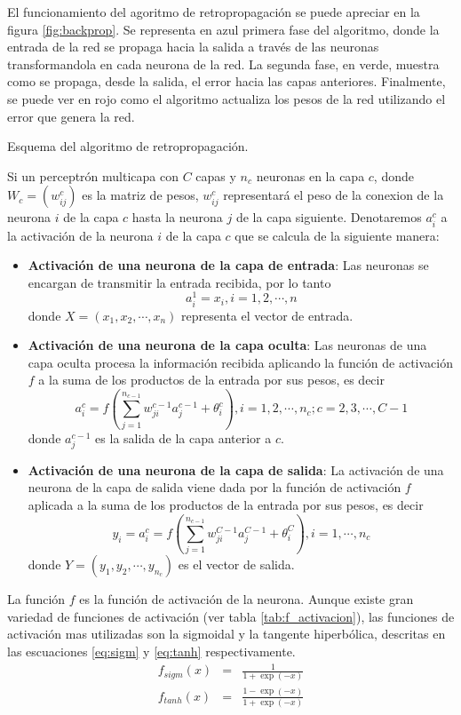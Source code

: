 El funcionamiento del agoritmo de retropropagación se puede apreciar en la figura \ref{fig:backprop}. Se representa en azul primera fase del algoritmo, donde la entrada de la red se propaga hacia la salida a través de las neuronas transformandola en cada neurona de la red. La segunda fase, en verde, muestra como se propaga, desde la salida, el error hacia las capas anteriores. Finalmente, se puede ver en rojo como el algoritmo actualiza los pesos de la red utilizando el error que genera la red.
\begin{imagen}
	\scalebox{1.0}{}
	\caption{Esquema del algoritmo de retropropagación.}
	\label{fig:backprop}
\end{imagen}

Si un perceptrón multicapa con $C$ capas y $n_c$ neuronas en la capa $c$, donde $W_c = (w^{c}_{ij})$ es la matriz de pesos, $w^{c}_{ij}$ representará el peso de la conexion de la neurona $i$ de la capa $c$ hasta la neurona $j$ de la capa siguiente. Denotaremos $a^{c}_{i}$ a la activación de la neurona $i$ de la capa $c$ que se calcula de la siguiente manera:
\begin{itemize}
	\item {\bf Activación de una neurona de la capa de entrada}: Las neuronas se encargan de transmitir la entrada recibida, por lo tanto $$ a^{1}_{i} = x_{i}, i = 1, 2, \cdots, n$$ donde $X = (x_1, x_2, \cdots, x_n)$ representa el vector de entrada.

	\item {\bf Activación de una neurona de la capa oculta}: Las neuronas de una capa oculta procesa la información recibida aplicando la función de activación $f$ a la suma de los productos de la entrada por sus pesos, es decir $$ a^{c}_{i} = f\left(\sum^{n_{c - 1}}_{j=1} w^{c - 1}_{ji}a^{c - 1}_{j} + \theta^{c}_{i}\right), i = 1, 2, \cdots, n_c; c = 2, 3, \cdots, C - 1$$ donde $a^{c - 1}_{j}$ es la salida de la capa anterior a $c$.

	\item {\bf Activación de una neurona de la capa de salida}: La activación de una neurona de la capa de salida viene dada por la función de activación $f$ aplicada a la suma de los productos de la entrada por sus pesos, es decir $$ y_{i} = a^{c}_{i} = f\left(\sum^{n_{c - 1}}_{j=1} w^{C - 1}_{ji}a^{C - 1}_{j} + \theta^{C}_{i}\right), i = 1, \cdots, n_c$$ donde $Y = (y_1, y_2, \cdots, y_{n_{c}})$ es el vector de salida.
\end{itemize}

La función $f$ es la función de activación de la neurona. Aunque existe gran variedad de funciones de activación (ver tabla \ref{tab:f_activacion}), las funciones de activación mas utilizadas son la sigmoidal y la tangente hiperbólica, descritas en las escuaciones \ref{eq:sigm} y \ref{eq:tanh} respectivamente.
\begin{eqnarray}
	f_{sigm}(x) &=& \frac{1}{1+\exp(-x)}\label{eq:sigm}\\
	f_{tanh}(x) &=& \frac{1 - \exp(-x)}{1 + \exp(-x)}\label{eq:tanh}
\end{eqnarray}

